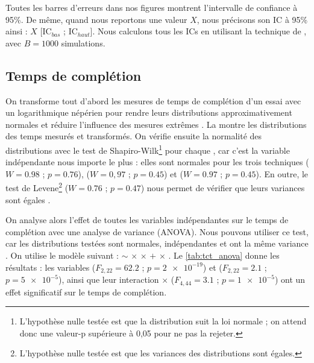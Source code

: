 Toutes les barres d'erreurs dans nos figures montrent l'intervalle de confiance à 95\%. De même, quand nous reportons une valeur $X$, nous précisons son IC à 95\% ainsi : $X$ [$\text{IC}_{bas}$ ; $\text{IC}_{haut}$]. Nous calculons tous les ICs en utilisant la technique de  \citep[p. 25]{Dragicevic2016}, avec $B=1000$ simulations.

\subsection{Temps de complétion}
\label{subsec:experiment_results_time}


On transforme tout d'abord les mesures de temps de complétion d'un essai avec un logarithmique népérien pour rendre leurs distributions approximativement normales et réduire l'influence des mesures extrêmes \citep[p. 25]{Dragicevic2016}. La  montre les distributions des temps mesurés et transformés. On vérifie ensuite la normalité des distributions avec le test de Shapiro-Wilk\footnote{L'hypothèse nulle testée est que la distribution suit la loi normale ; on attend donc une valeur-p supérieure à 0,05 pour ne pas la rejeter.} \citep{Wobbrock2016} pour chaque , car c'est la variable indépendante nous importe le plus : elles sont normales pour les trois techniques  ($W = \num{0.98}$ ; $p = \num{0.76}$),  ($W = 0,97$ ; $p = \num{0.45}$) et  ($W = \num{0.97}$ ; $p = \num{0.45}$). En outre, le test de Levene\footnote{L'hypothèse nulle testée est que les variances des distributions sont égales.} ($W = \num{0.76}$ ; $p = \num{0.47}$) nous permet de vérifier que leurs variances sont égales \citep{Wobbrock2016}.

On analyse alors l'effet de toutes les variables indépendantes sur le temps de complétion avec une analyse de variance (ANOVA). Nous pouvons utiliser ce test, car les distributions testées sont normales, indépendantes et ont la même variance \citep{Wobbrock2016}. On utilise le modèle suivant :  $\sim$  $\times$  $\times$  $+$  $\times$ . Le \autoref{tab:tct_anova} donne les résultats : les variables  ($F_{2,22} = \num{62.2}$ ; $p = \num{2e-19}$) et  ($F_{2,22} = \num{2.1}$ ; $p = \num{5e-5}$), ainsi que leur interaction  $\times$  ($F_{4,44} = \num{3.1}$ ; $p = \num{1e-5}$) ont un effet significatif sur le temps de complétion.

